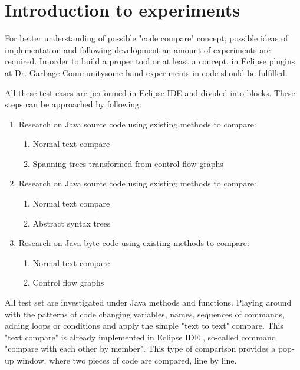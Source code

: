 \documentclass{report}
\begin{document}
\section{Introduction to experiments}

For better understanding of possible "code compare" concept, possible ideas of implementation and following development an amount of experiments are required.
In order to build a proper tool or at least a concept, in Eclipse plugins at Dr. Garbage Community\textregistered \enspace some hand experiments in code should be fulfilled.

All these test cases are performed in Eclipse IDE \cite{eclipse_site} and divided into blocks. These steps can be approached by following:

\begin{enumerate}
  \item Research on Java source code using existing methods to compare:
  	\begin{enumerate}
   	 	\item Normal text compare
   		 \item Spanning trees transformed from control flow graphs
	 \end{enumerate}	
	 
  \item Research on Java source code using existing methods to compare:
  \begin{enumerate}
    \item Normal text compare 
    \item Abstract syntax trees
  \end{enumerate}
  
  \item Research on Java byte code using existing methods to compare:
  \begin{enumerate}
    \item Normal text compare 
    \item Control flow graphs
  \end{enumerate}
\end{enumerate}

All test set are investigated under Java methods and functions. Playing around with the patterns of code changing variables, names, sequences of commands, adding loops or conditions and apply the simple "text to text" compare. This "text compare" is already implemented in Eclipse IDE \cite{eclipse_site}, so-called command "compare with each other by member". This type of comparison provides a pop-up window, where two pieces of code are compared, line by line.
\end{document}

